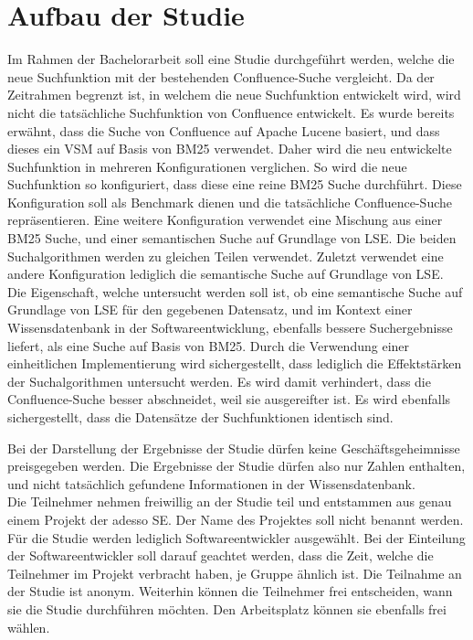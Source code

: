 \section{Aufbau der Studie}
Im Rahmen der Bachelorarbeit soll eine Studie durchgeführt werden, welche die neue Suchfunktion mit der bestehenden Confluence-Suche vergleicht.
Da der Zeitrahmen begrenzt ist, in welchem die neue Suchfunktion entwickelt wird, wird nicht die tatsächliche Suchfunktion von Confluence entwickelt.
Es wurde bereits erwähnt, dass die Suche von Confluence auf Apache Lucene basiert, und dass dieses ein VSM auf Basis von BM25 verwendet.
Daher wird die neu entwickelte Suchfunktion in mehreren Konfigurationen verglichen.
So wird die neue Suchfunktion so konfiguriert, dass diese eine reine BM25 Suche durchführt.
Diese Konfiguration soll als Benchmark dienen und die tatsächliche Confluence-Suche repräsentieren.
Eine weitere Konfiguration verwendet eine Mischung aus einer BM25 Suche, und einer semantischen Suche auf Grundlage von LSE.
Die beiden Suchalgorithmen werden zu gleichen Teilen verwendet.
Zuletzt verwendet eine andere Konfiguration lediglich die semantische Suche auf Grundlage von LSE.\\

Die Eigenschaft, welche untersucht werden soll ist, ob eine semantische Suche auf Grundlage von LSE für den gegebenen Datensatz, und im Kontext einer Wissensdatenbank in der Softwareentwicklung, ebenfalls bessere Suchergebnisse liefert, als eine Suche auf Basis von BM25.
Durch die Verwendung einer einheitlichen Implementierung wird sichergestellt, dass lediglich die Effektstärken der Suchalgorithmen untersucht werden.
Es wird damit verhindert, dass die Confluence-Suche besser abschneidet, weil sie ausgereifter ist.
Es wird ebenfalls sichergestellt, dass die Datensätze der Suchfunktionen identisch sind.



Bei der Darstellung der Ergebnisse der Studie dürfen keine Geschäftsgeheimnisse preisgegeben werden.
Die Ergebnisse der Studie dürfen also nur Zahlen enthalten, und nicht tatsächlich gefundene Informationen in der Wissensdatenbank.\\

Die Teilnehmer nehmen freiwillig an der Studie teil und entstammen aus genau einem Projekt der adesso SE.
Der Name des Projektes soll nicht benannt werden.
Für die Studie werden lediglich Softwareentwickler ausgewählt.
Bei der Einteilung der Softwareentwickler soll darauf geachtet werden, dass die Zeit, welche die Teilnehmer im Projekt verbracht haben, je Gruppe ähnlich ist.
Die Teilnahme an der Studie ist anonym.
Weiterhin können die Teilnehmer frei entscheiden, wann sie die Studie durchführen möchten.
Den Arbeitsplatz können sie ebenfalls frei wählen.\\


